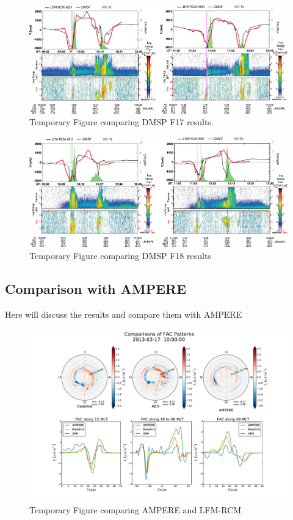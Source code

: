 \documentclass[draft,jgrga]{agutex}
\begin{document}
\begin{article}
\begin{figure}[t]
\noindent\includegraphics[width=39pc]{DMSP_F17_AEH_compare.png}
\caption{\label{f17-comp-fig}
Temporary Figure comparing DMSP F17 results. }
\end{figure}

\begin{figure}[t]
\noindent\includegraphics[width=39pc]{DMSP_F18_AEH_compare.png}
\caption{\label{f18-comp-fig}
Temporary Figure comparing DMSP F18 results}
\end{figure}

 \subsection{Comparison with AMPERE}
 Here will discuss the results and compare them with AMPERE
 
\begin{figure}[t]
\noindent\includegraphics[width=39pc]{AmpereComparison.pdf}
\caption{\label{ampere-comp-fig}
Temporary Figure comparing AMPERE and LFM-RCM}
\end{figure}


\end{article}
\end{document}
